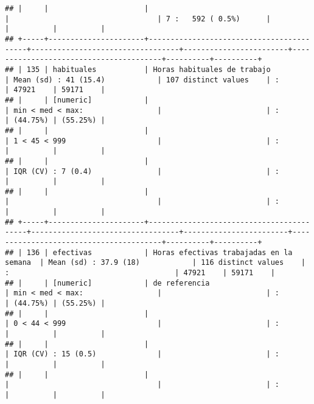 \documentclass[]{article}
\begin{document}
\begin{verbatim}
## |     |                      |                                          |                                  | 7 :   592 ( 0.5%)      |                                        |          |          |
## +-----+----------------------+------------------------------------------+----------------------------------+------------------------+----------------------------------------+----------+----------+
## | 135 | habituales           | Horas habituales de trabajo              | Mean (sd) : 41 (15.4)            | 107 distinct values    | :                                      | 47921    | 59171    |
## |     | [numeric]            |                                          | min < med < max:                 |                        | :                                      | (44.75%) | (55.25%) |
## |     |                      |                                          | 1 < 45 < 999                     |                        | :                                      |          |          |
## |     |                      |                                          | IQR (CV) : 7 (0.4)               |                        | :                                      |          |          |
## |     |                      |                                          |                                  |                        | :                                      |          |          |
## +-----+----------------------+------------------------------------------+----------------------------------+------------------------+----------------------------------------+----------+----------+
## | 136 | efectivas            | Horas efectivas trabajadas en la semana  | Mean (sd) : 37.9 (18)            | 116 distinct values    | :                                      | 47921    | 59171    |
## |     | [numeric]            | de referencia                            | min < med < max:                 |                        | :                                      | (44.75%) | (55.25%) |
## |     |                      |                                          | 0 < 44 < 999                     |                        | :                                      |          |          |
## |     |                      |                                          | IQR (CV) : 15 (0.5)              |                        | :                                      |          |          |
## |     |                      |                                          |                                  |                        | :                                      |          |          |

\end{verbatim}
\end{document}
